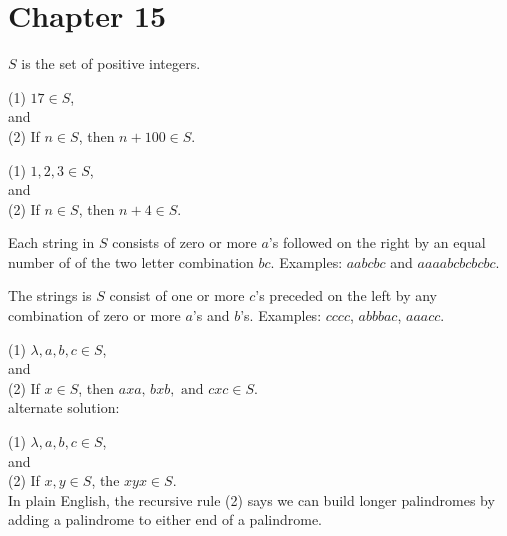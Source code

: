     \section*{Chapter 15}

\begin{Solution}{15.1}

$S$ is the set of positive integers.

\end{Solution}


\begin{Solution}{15.2}

(1) $17\in S$,\\
and\\
(2) If $n\in S$, then $n+100\in S$.

\end{Solution}


\begin{Solution}{15.3}

(1) $1,2,3\in S$,\\
and\\
(2) If $n\in S$, then $n+4\in S$. 

\end{Solution}


\begin{Solution}{15.4}

Each string in $S$ consists of zero or more $a$'s followed on the right by an
equal number of of the two letter combination $bc$. Examples: $aabcbc$ and
$aaaabcbcbcbc$. 

\end{Solution}


\begin{Solution}{15.5}

The strings is $S$ consist of one or more $c$'s preceded on the left
by any combination of zero or more $a$'s and $b$'s. Examples:
$cccc$, $abbbac$, $aaacc$.

\end{Solution}


\begin{Solution}{15.6}

(1) $\lambda, a, b, c \in S$,\\
and\\
(2) If $x\in S$, then $axa,\, bxb,\text{ and } cxc\in S$.\\[5pt]

alternate solution:

(1) $\lambda, a, b, c \in S$,\\
and\\
(2) If $x,y\in S$, the $xyx\in S$.\\
In plain English, the recursive rule (2) says we can build longer
 palindromes by adding a palindrome to either end of a palindrome.
 
\end{Solution}
